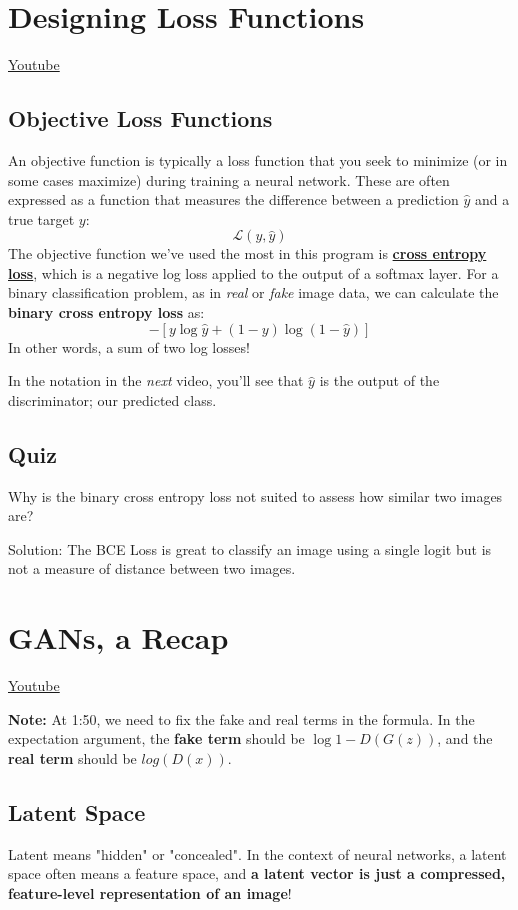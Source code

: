 \section{Designing Loss Functions}
\href{https://www.youtube.com/watch?v=YL1kKWHr7Gc}{Youtube}
\subsection{Objective Loss Functions}
An objective function is typically a loss function that you seek to minimize (or in some cases maximize) during training a neural network. These are often expressed as a function that measures the difference between a prediction \(\hat{y}\) and a true target \(y\): \[\mathcal{L}(y, \hat{y})\]
The objective function we've used the most in this program is \href{https://ml-cheatsheet.readthedocs.io/en/latest/loss_functions.html}{\textbf{cross entropy loss}}, which is a negative log loss applied to the output of a softmax layer. For a binary classification problem, as in \textit{real} or \textit{fake} image data, we can calculate the \textbf{binary cross entropy loss} as: \[-[y \log{\hat{y}} + (1 - y)\log{(1-\hat{y})}]\]
In other words, a sum of two log losses! \newline

In the notation in the \textit{next} video, you'll see that \(\hat{y}\) is the output of the discriminator; our predicted class.

\subsection{Quiz}
Why is the binary cross entropy loss not suited to assess how similar two images are? \newline

Solution: The BCE Loss is great to classify an image using a single logit but is not a measure of distance between two images.


\section{GANs, a Recap}
\href{https://www.youtube.com/watch?v=MEKTiR1Xkjg}{Youtube} \newline

\textbf{Note:} At 1:50, we need to fix the fake and real terms in the formula. In the expectation argument, the \textbf{fake term} should be \(\log{1 - D(G(z))}\), and the \textbf{real term} should be \(log(D(x))\).
\subsection{Latent Space}
Latent means "hidden" or "concealed". In the context of neural networks, a latent space often means a feature space, and \textbf{a latent vector is just a compressed, feature-level representation of an image}! \newline

